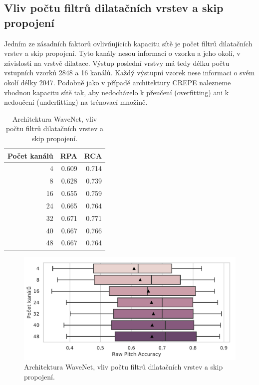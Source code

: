 \subsection{Vliv počtu filtrů dilatačních vrstev a skip propojení}

Jedním ze zásadních faktorů ovlivňujících kapacitu sítě je počet filtrů dilatačních vrstev a skip propojení. Tyto kanály nesou informaci o vzorku a jeho okolí, v závislosti na vrstvě dilatace. Výstup poslední vrstvy má tedy délku počtu vstupních vzorků 2848 a 16 kanálů. Každý výstupní vzorek nese informaci o svém okolí délky 2047. Podobně jako v případě architektury CREPE nalezneme vhodnou kapacitu sítě tak, aby nedocházelo k přeučení (overfitting) ani k nedoučení (underfitting) na trénovací množině.

\begin{table}[h!]
\centering
    \begin{tabular}{rrr}
    \toprule
    Počet kanálů &   RPA &   RCA \\
    \midrule
            4 & 0.609 & 0.714 \\
            8 & 0.628 & 0.739 \\
            16 & 0.655 & 0.759 \\
            24 & 0.665 & 0.764 \\
            32 & 0.671 & 0.771 \\
            40 & 0.667 & 0.766 \\
            48 & 0.667 & 0.764 \\
    \bottomrule
    \end{tabular}

\caption{Architektura WaveNet, vliv počtu filtrů dilatačních vrstev a skip propojení.}\label{tab:wavenet_dil_skip_channels}
\end{table}

\begin{figure}[h]\centering
    \includegraphics[scale=0.6]{../img/figures/wavenet_dil_skip_channels.pdf}
\caption{Architektura WaveNet, vliv počtu filtrů dilatačních vrstev a skip propojení.}\label{obr:wavenet_dil_skip_channels}
\end{figure}

